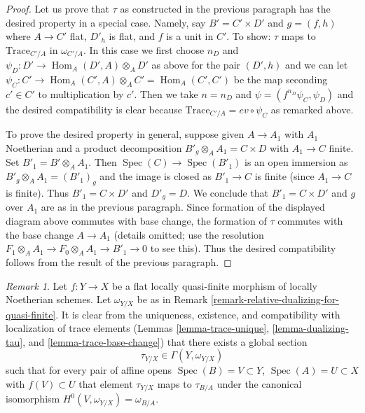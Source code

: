 \documentclass{stacks-project}
\theoremstyle{plain}
\theoremstyle{definition}
\theoremstyle{remark}
\newtheorem{remark}[subsection]{Remark}
\numberwithin{equation}{subsection}
\def\Spec{\mathop{\mathrm{Spec}}}
\def\Hom{\mathop{\mathrm{Hom}}\nolimits}
\begin{document}
\begin{proof}
\medskip\noindent
Let us prove that $\tau$ as constructed in the previous paragraph
has the desired property in a special case. Namely, say
$B' = C' \times D'$ and $g = (f, h)$ where $A \to C'$ flat, $D'_h$ is flat, and
$f$ is a unit in $C'$.
To show: $\tau$ maps to $\text{Trace}_{C'/A}$ in $\omega_{C'/A}$.
In this case we first choose $n_D$ and
$\psi_D : D' \to \Hom_A(D', A) \otimes_A D'$ as above for the pair
$(D', h)$ and we can let
$\psi_C : C' \to \Hom_A(C', A) \otimes_A C' = \Hom_A(C', C')$
be the map seconding $c' \in C'$ to multiplication by $c'$.
Then we take $n = n_D$ and $\psi = (f^{n_D} \psi_C, \psi_D)$
and the desired compatibility is clear because
$\text{Trace}_{C'/A} = ev \circ \psi_C$ as remarked above.

\medskip\noindent
To prove the desired property in general, suppose given
$A \to A_1$ with $A_1$ Noetherian and a product decomposition
$B'_g \otimes_A A_1 = C \times D$ with $A_1 \to C$ finite.
Set $B'_1 = B' \otimes_A A_1$. Then $\Spec(C) \to \Spec(B'_1)$
is an open immersion as $B'_g \otimes_A A_1 = (B'_1)_g$ and
the image is closed as $B'_1 \to C$ is finite (since $A_1 \to C$
is finite). Thus $B'_1 = C \times D'$ and $D'_g = D$.
We conclude that $B'_1 = C \times D'$ and $g$ over $A_1$
are as in the previous paragraph.
Since formation of the displayed diagram above
commutes with base change, the formation of $\tau$ commutes
with the base change $A \to A_1$ (details omitted; use the
resolution $F_1 \otimes_A A_1 \to F_0 \otimes_A A_1 \to B'_1 \to 0$
to see this). Thus the desired compatibility follows from the result
of the previous paragraph.
\end{proof}

\begin{remark}
\label{remark-relative-dualizing-for-flat-quasi-finite}
Let $f : Y \to X$ be a flat locally quasi-finite morphism of locally
Noetherian schemes. Let $\omega_{Y/X}$ be as in
Remark \ref{remark-relative-dualizing-for-quasi-finite}.
It is clear from the uniqueness, existence, and compatibility with
localization of trace elements
(Lemmas \ref{lemma-trace-unique}, \ref{lemma-dualizing-tau}, and
\ref{lemma-trace-base-change})
that there exists a global section
$$
\tau_{Y/X} \in \Gamma(Y, \omega_{Y/X})
$$
such that for every pair of affine opens
$\Spec(B) = V \subset Y$, $\Spec(A) = U \subset X$ with $f(V) \subset U$
that element $\tau_{Y/X}$ maps to $\tau_{B/A}$ under the
canonical isomorphism
$H^0(V, \omega_{Y/X}) = \omega_{B/A}$.
\end{remark}
\end{document}
